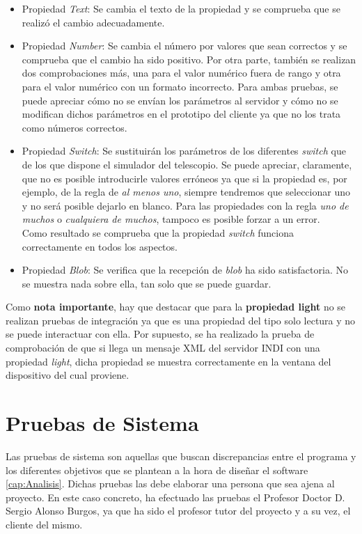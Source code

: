 \begin{itemize}
  \item Propiedad \textit{Text}: Se cambia el texto de la propiedad y se comprueba que se realizó el cambio adecuadamente.
  \item Propiedad \textit{Number}: Se cambia el número por valores que sean correctos y se comprueba que el cambio ha sido positivo. Por otra parte, también se realizan dos comprobaciones más, una para el valor numérico fuera de rango y otra para el valor numérico con un formato incorrecto. Para ambas pruebas, se puede apreciar cómo no se envían los parámetros al servidor y cómo no se modifican dichos parámetros en el prototipo del cliente ya que no los trata como números correctos.
  \item Propiedad \textit{Switch}: Se sustituirán los parámetros de los diferentes \textit{switch} que de los que dispone el simulador del telescopio. Se puede apreciar, claramente, que no es posible introducirle valores erróneos ya que si la propiedad es, por ejemplo, de la regla de \textit{al menos uno}, siempre tendremos que seleccionar uno y no será posible dejarlo en blanco. Para las propiedades con la regla \textit{uno de muchos} o \textit{cualquiera de muchos}, tampoco es posible forzar a un error.\\
  Como resultado se comprueba que la propiedad \textit{switch} funciona correctamente en todos los aspectos.
  \item Propiedad \textit{Blob}: Se verifica que la recepción de \textit{blob} ha sido satisfactoria. No se muestra nada sobre ella, tan solo que se puede guardar.
\end{itemize}

Como \textbf{nota importante}, hay que destacar que para la \textbf{propiedad light} no se realizan pruebas de integración ya que es una propiedad del tipo solo lectura y no se puede interactuar con ella. Por supuesto, se ha realizado la prueba de comprobación de que si llega un mensaje XML del servidor INDI con una propiedad \textit{light}, dicha propiedad se muestra correctamente en la ventana del dispositivo del cual proviene.

\section{Pruebas de Sistema}
Las pruebas de sistema son aquellas que buscan discrepancias entre el programa y los diferentes objetivos que se plantean a la hora de diseñar el software \ref{cap:Analisis}.
Dichas pruebas las debe elaborar una persona que sea ajena al proyecto. En este caso concreto, ha efectuado las pruebas el Profesor Doctor  D. Sergio Alonso Burgos, ya que ha sido el profesor tutor del proyecto y a su vez, el cliente del mismo.\\

